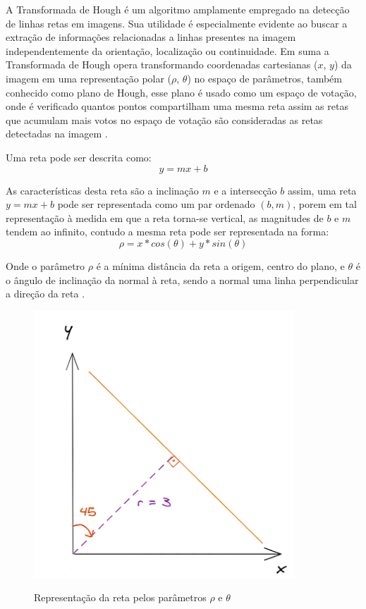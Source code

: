 A Transformada de Hough é um algoritmo amplamente empregado na detecção de linhas retas em imagens. Sua utilidade é especialmente evidente ao buscar a extração de informações relacionadas a linhas presentes na imagem independentemente da orientação, localização ou continuidade. Em suma a Transformada de Hough opera transformando coordenadas cartesianas ($x$, $y$) da imagem em uma representação polar ($\rho$, $\theta$) no espaço de parâmetros, também conhecido como plano de Hough, esse plano é usado como um espaço de votação, onde é verificado quantos pontos compartilham uma mesma reta assim as retas que acumulam mais votos no espaço de votação são consideradas as retas detectadas na imagem \cite{transformadaHough1}.


Uma reta pode ser descrita como: $$y = mx + b$$

As características desta reta são a inclinação $m$ e a intersecção $b$ assim, uma reta $y = mx + b$ pode ser representada como um par ordenado $(b, m)$, porem em tal representação à medida em que a reta torna-se vertical, as magnitudes de $b$ e $m$ tendem ao infinito, contudo a mesma reta pode ser representada na forma:  $$\rho = x*cos(\theta)+y*sin(\theta)$$

Onde o parâmetro $\rho$ é a mínima distância da reta a origem, centro do plano, e $\theta$ é o ângulo de inclinação da normal à reta, sendo a normal uma linha perpendicular a direção da reta \cite{detectBar}.

\begin{figure}[!htb]
	\centering
    \caption{Representação da reta pelos parâmetros $\rho$ e $\theta$}
	\includegraphics[scale=2]{figuras/math/rhotheta.png}
    \label{fig:Representacao da reta pelos parametros}
\end{figure}

